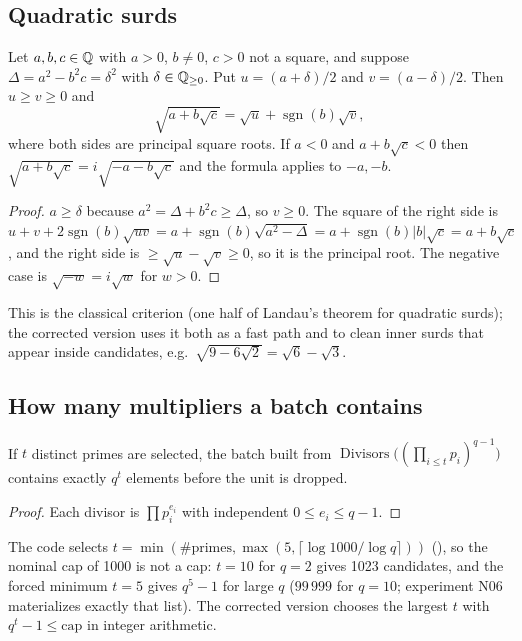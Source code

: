 \subsection{Quadratic surds}
\begin{proposition}\label{prop:surd}
Let $a,b,c\in\mathbb{Q}$ with $a>0$, $b\ne0$, $c>0$ not a square, and suppose
$\Delta=a^2-b^2c=\delta^2$ with $\delta\in\mathbb{Q}_{\ge0}$. Put $u=(a+\delta)/2$ and
$v=(a-\delta)/2$. Then $u\ge v\ge0$ and
\[
\sqrt{a+b\sqrt c}=\sqrt u+\operatorname{sgn}(b)\sqrt v ,
\]
where both sides are principal square roots. If $a<0$ and $a+b\sqrt c<0$ then
$\sqrt{a+b\sqrt c}=i\sqrt{-a-b\sqrt c}$ and the formula applies to $-a,-b$.
\end{proposition}
\begin{proof}
$a\ge\delta$ because $a^2=\Delta+b^2c\ge\Delta$, so $v\ge0$. The square of the right
side is $u+v+2\operatorname{sgn}(b)\sqrt{uv}=a+\operatorname{sgn}(b)\sqrt{a^2-\Delta}
=a+\operatorname{sgn}(b)|b|\sqrt c=a+b\sqrt c$, and the right side is
$\ge\sqrt u-\sqrt v\ge0$, so it is the principal root. The negative case is
$\sqrt{-w}=i\sqrt w$ for $w>0$.
\end{proof}
This is the classical criterion (one half of Landau's theorem for quadratic
surds); the corrected version uses it both as a fast path and to clean inner
surds that appear inside candidates, e.g.\ $\sqrt{9-6\sqrt2}=\sqrt6-\sqrt3$.

\subsection{How many multipliers a batch contains}
\begin{proposition}\label{prop:count}
If $t$ distinct primes are selected, the batch built from
$\operatorname{Divisors}\big((\prod_{i\le t}p_i)^{q-1}\big)$ contains exactly $q^t$
elements before the unit is dropped.
\end{proposition}
\begin{proof}
Each divisor is $\prod p_i^{e_i}$ with independent $0\le e_i\le q-1$.
\end{proof}
The code selects $t=\min(\#\text{primes},\max(5,\lceil\log1000/\log q\rceil))$
(), so the nominal cap of 1000 is not a cap: $t=10$ for $q=2$
gives 1023 candidates, and the forced minimum $t=5$ gives $q^5-1$ for large
$q$ ($99\,999$ for $q=10$; experiment N06 materializes exactly that list). The
corrected version chooses the largest $t$ with $q^t-1\le\text{cap}$ in integer
arithmetic.
